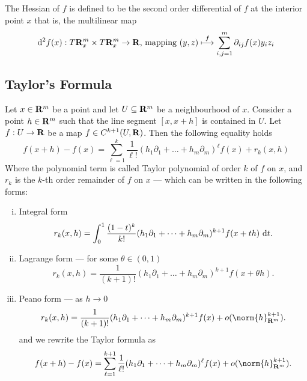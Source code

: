\begin{definition}
  The Hessian of \(f\) is defined to be the second order differential of \(f\)
  at the interior point \(x\) that is, the multilinear map
  \[
    \mathrm{d}^2 f(x): T\mathbf{R}^m_x \times T\mathbf{R}^m_x \to \mathbf{R}\text{, mapping }
    (y, z) \overset f \longmapsto \sum_{i, j = 1}^m \partial_{ij} f(x) y_i z_i
  \]
\end{definition}

\subsection{Taylor's Formula}

\begin{theorem}\label{thm: taylor-poly-Rn}
  Let \(x \in \mathbf{R}^m\) be a point and let \(U \subseteq \mathbf{R}^m\) be a neighbourhood
  of \(x\). Consider a point \(h \in \mathbf{R}^m\) such that the line segment \([x, x +
  h]\) is contained in \(U\). Let \(f: U \to \mathbf{R}\) be a map \(f \in C^{k+1}(U, \mathbf{R})\).
  Then the following equality holds
  \[
    f(x + h) - f(x) = \sum_{\ell=1}^k
    \frac 1 {\ell!} (h_1 \partial_1 + \dots + h_m \partial_m)^\ell f(x)
    + r_k(x, h)
  \]
  Where the polynomial term is called Taylor polynomial of order \(k\) of \(f\)
  on \(x\), and \(r_k\) is the \(k\)-th order remainder of \(f\) on \(x\) ---
  which can be written in the following forms:
  \begin{enumerate}[(i)]
    \item Integral form
      \[
        r_k(x, h) = \int_0^1 \frac{(1 - t)^k}{k!} (h_1 \partial_1 + \dots + h_m
        \partial_m)^{k+1} f(x + th)\ \mathrm{d} t.
      \]
    \item Lagrange form --- for some \(\theta \in (0, 1)\)
      \[
        r_k(x, h) = \frac 1 {(k + 1)!} (h_1 \partial_1 + \dots + h_m
        \partial_m)^{k+1} f(x + \theta h).
      \]
    \item Peano form --- as \(h \to 0\)
      \[
        r_k(x, h) = \frac 1 {(k + 1)!} (h_1 \partial_1 + \dots + h_m
        \partial_m)^{k+1} f(x) + o(\norm{h}_{\R^m}^{k+1}).
      \]
      and we rewrite the Taylor formula as
      \[
        f(x + h) - f(x) = \sum_{\ell=1}^{k+1}
        \frac 1 {\ell!} (h_1 \partial_1 + \dots + h_m \partial_m)^\ell f(x)
        + o(\norm{h}_{\R^m}^{k+1}).
      \]
  \end{enumerate}
\end{theorem}


